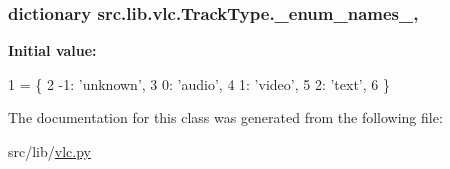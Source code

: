 \subsubsection[{\+\_\+enum\+\_\+names\+\_\+}]{\setlength{\rightskip}{0pt plus 5cm}dictionary src.\+lib.\+vlc.\+Track\+Type.\+\_\+enum\+\_\+names\+\_\+\hspace{0.3cm}{\ttfamily [static]}, {\ttfamily [private]}}\label{classsrc_1_1lib_1_1vlc_1_1TrackType_aa3208a05816c8c0f30e111fae7974667}
{\bfseries Initial value\+:}
\begin{DoxyCode}
1 = \{
2         -1: \textcolor{stringliteral}{'unknown'},
3         0: \textcolor{stringliteral}{'audio'},
4         1: \textcolor{stringliteral}{'video'},
5         2: \textcolor{stringliteral}{'text'},
6     \}
\end{DoxyCode}


The documentation for this class was generated from the following file\+:\begin{DoxyCompactItemize}
\item 
src/lib/\hyperlink{vlc_8py}{vlc.\+py}\end{DoxyCompactItemize}
